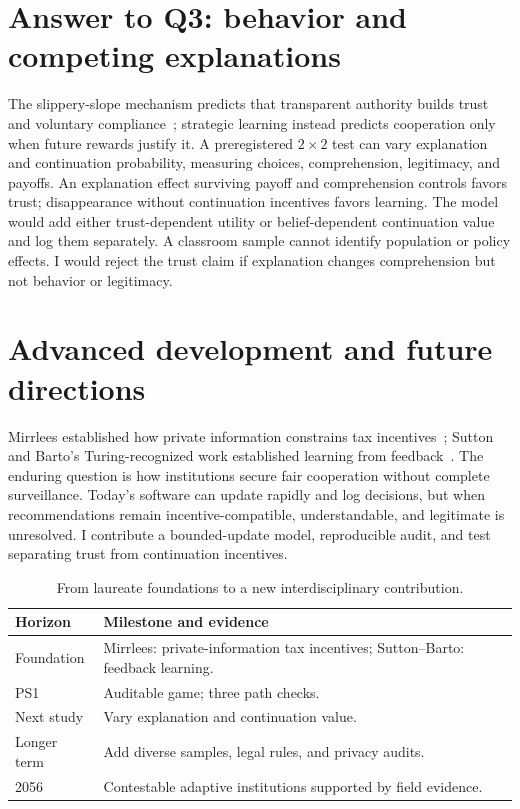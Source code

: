 \clearpage\balance
\section{Answer to Q3: behavior and competing explanations}
The slippery-slope mechanism predicts that transparent authority builds trust and voluntary compliance~\cite{kirchler2008}; strategic learning instead predicts cooperation only when future rewards justify it. A preregistered $2\times2$ test can vary explanation and continuation probability, measuring choices, comprehension, legitimacy, and payoffs. An explanation effect surviving payoff and comprehension controls favors trust; disappearance without continuation incentives favors learning. The model would add either trust-dependent utility or belief-dependent continuation value and log them separately. A classroom sample cannot identify population or policy effects. I would reject the trust claim if explanation changes comprehension but not behavior or legitimacy.


\section{Advanced development and future directions}
Mirrlees established how private information constrains tax incentives~\cite{mirrlees1971,nobel1996}; Sutton and Barto's Turing-recognized work established learning from feedback~\cite{acm2024}. The enduring question is how institutions secure fair cooperation without complete surveillance. Today's software can update rapidly and log decisions, but when recommendations remain incentive-compatible, understandable, and legitimate is unresolved. I contribute a bounded-update model, reproducible audit, and test separating trust from continuation incentives.

\begin{table}[h]\caption{From laureate foundations to a new interdisciplinary contribution.}
\begin{tabularx}{\columnwidth}{@{}p{1.6cm}Y@{}}\toprule
\textbf{Horizon}&\textbf{Milestone and evidence}\\\midrule
Foundation&Mirrlees: private-information tax incentives; Sutton--Barto: feedback learning.\\
PS1&Auditable game; three path checks.\\
Next study&Vary explanation and continuation value.\\
Longer term&Add diverse samples, legal rules, and privacy audits.\\
2056&Contestable adaptive institutions supported by field evidence.\\\bottomrule
\end{tabularx}\end{table}


